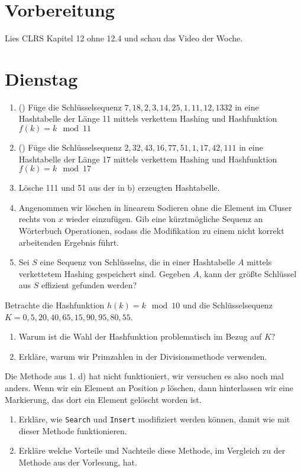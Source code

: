 \documentclass{uebung_cs}
\begin{document}
\section*{Vorbereitung}
Lies CLRS Kapitel 12 ohne 12.4 und schau das Video der Woche.

\section*{Dienstag}
\begin{aufgabe}\label{tue-first}
	\begin{enumerate}
		\item (\warmup) Füge die Schlüsselsequenz $7, 18, 2, 3, 14, 25, 1, 11, 12, 1332$ in eine Hashtabelle der Länge 11 mittels verkettem Hashing und Hashfunktion $f(k) = k \mod 11$
		\item (\warmup) Füge die Schlüsselsequenz $2, 32, 43, 16, 77, 51, 1, 17, 42, 111$ in eine Hashtabelle der Länge 17 mittels verkettem Hashing und Hashfunktion $f(k) = k \mod 17$
		\item Lösche 111 und 51 aus der in b) erzeugten Hashtabelle.
		\item Angenommen wir löschen in linearem Sodieren ohne die Element im Cluser rechts von $x$ wieder einzufügen.
			Gib eine kürztmögliche Sequenz an Wörterbuch Operationen, sodass die Modifikation zu einem nicht korrekt arbeitenden Ergebnis führt.
		\item Sei $S$ eine Sequenz von Schlüsselns, die in einer Hashtabelle $A$ mittels verkettetem Hashing gespeichert sind.
			Gegeben $A$, kann der größte Schlüssel aus $S$ effizient gefunden werden?
	\end{enumerate}
\end{aufgabe}

\begin{aufgabe}
	Betrachte die Hashfunktion $h(k) = k \mod 10$ und die Schlüsselsequenz $K = 0, 5, 20, 40, 65, 15, 90, 95, 80, 55$.
	\begin{enumerate}
		\item Warum ist die Wahl der Hashfunktion problematisch im Bezug auf $K$?
		\item Erkläre, warum wir Primzahlen in der Divisionsmethode verwenden.
	\end{enumerate}
\end{aufgabe}

\begin{aufgabe}
	Die Methode aus 1. d) hat nicht funktioniert, wir versuchen es also noch mal anders.
	Wenn wir ein Element an Position $p$ löschen, dann hinterlassen wir eine Markierung, das dort ein Element gelöscht worden ist.
	\begin{enumerate}
		\item Erkläre, wie \texttt{Search} und \texttt{Insert} modifiziert werden können, damit wie mit dieser Methode funktionieren.
		\item Erkläre welche Vorteile und Nachteile diese Methode, im Vergleich zu der Methode aus der Vorlesung, hat.
	\end{enumerate}
\end{aufgabe}
\end{document}
